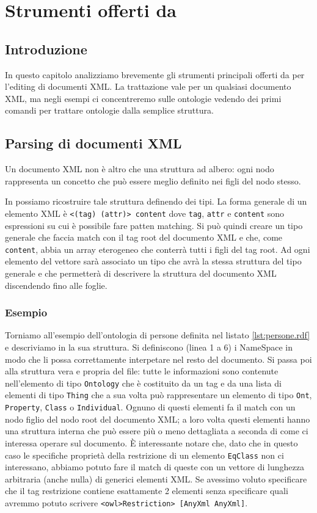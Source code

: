 \chapter{Strumenti offerti da \cduce}\label{ch2}
\section{Introduzione}
In questo capitolo analizziamo brevemente gli strumenti principali offerti da \cduce per l'editing di documenti XML. La trattazione vale per un qualsiasi documento XML, ma negli esempi ci concentreremo sulle ontologie vedendo dei primi comandi per trattare ontologie dalla semplice struttura. 


\section{Parsing di documenti XML}
Un documento XML non è altro che una struttura ad albero: ogni nodo rappresenta un concetto che può essere meglio definito nei figli del nodo stesso. 

In \cduce possiamo ricostruire tale struttura definendo dei tipi. La forma generale di un elemento XML è \verb|<(tag) (attr)> content| dove \verb|tag|, \verb|attr| e \verb|content| sono espressioni su cui è possibile fare patten matching. Si può quindi creare un tipo generale che faccia match con il tag root del documento XML e che, come \verb|content|, abbia un array eterogeneo che conterrà tutti i figli del tag root. Ad ogni elemento del vettore sarà associato un tipo che avrà la stessa struttura del tipo generale e che permetterà di descrivere la struttura del documento XML discendendo fino alle foglie.
\subsection{Esempio}
Torniamo all'esempio dell'ontologia di persone definita nel listato \ref{lst:persone.rdf} e descriviamo in \cduce la sua struttura.
Si definiscono (linea 1 a 6) i NameSpace in modo che \cduce li possa correttamente interpetare nel resto del documento. Si passa poi alla struttura vera e propria del file: tutte le informazioni sono contenute nell'elemento di tipo \verb|Ontology| che è costituito da un tag e da una lista di elementi di tipo \verb|Thing| che a sua volta può rappresentare un elemento di tipo \verb|Ont|, \verb|Property|, \verb|Class| o \verb|Individual|. Ognuno di questi elementi fa il match con un nodo figlio del nodo root del documento XML; a loro volta questi elementi hanno una struttura interna che può essere più o meno dettagliata a seconda di come ci interessa operare sul documento. È interessante notare che, dato che in questo caso le specifiche proprietà della restrizione di un elemento \verb|EqClass| non ci interessano, abbiamo potuto fare il match di queste con un vettore di lunghezza arbitraria (anche nulla) di generici elementi XML. Se avessimo voluto specificare che il tag restrizione contiene esattamente 2 elementi senza specificare quali avremmo potuto scrivere \verb|<owl>Restriction> [AnyXml AnyXml]|.

